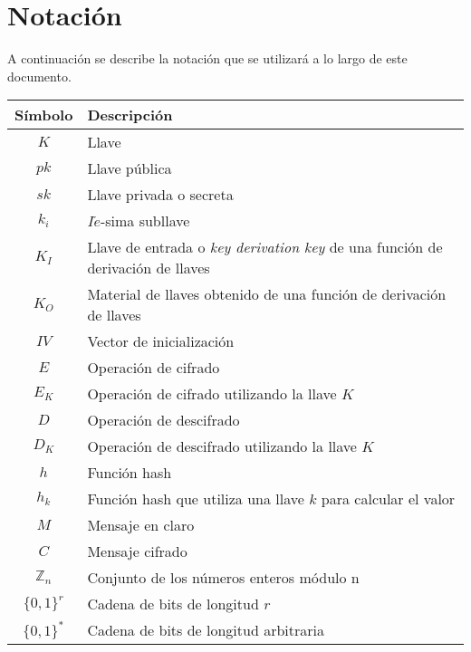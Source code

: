 %
%

\section*{Notación}

A continuación se describe la notación que se utilizará a lo largo de
este documento.

\begin{table}[H]
  \begin{center}
    \begin{tabular}{c|l}
      \hline
      Símbolo & Descripción \\
      \hline
      $K$ & Llave \\
      \hline
      $pk$ & Llave pública \\
      \hline
      $sk$ & Llave privada o secreta \\
      \hline
      $k_i$ & $I\acute{e}$-sima subllave \\
      \hline
      $K_I$ & Llave de entrada o \textit{key derivation key} de una función
      de derivación de llaves \\
      \hline
      $K_O$ & Material de llaves obtenido de una función de derivación de llaves \\
      \hline
      $IV$ & Vector de inicialización \\
      \hline
      $E$ & Operación de cifrado \\
      \hline
      $E_K$ & Operación de cifrado utilizando la llave $K$ \\
      \hline
      $D$ & Operación de descifrado \\
      \hline
      $D_K$ & Operación de descifrado utilizando la llave $K$ \\
      \hline
      $h$ & Función hash \\
      \hline
      $h_k$ & Función hash que utiliza una llave $k$ para calcular el valor\\
      \hline
      $M$ & Mensaje en claro\\
      \hline
      $C$ & Mensaje cifrado\\
      \hline
      $\mathbb{Z}_n$ & Conjunto de los números enteros módulo n\\
      \hline
      $\{0,1\}^r$ & Cadena de bits de longitud $r$ \\
      \hline
      $\{0,1\}^*$ & Cadena de bits de longitud arbitraria \\

\end{tabular}
\end{center}
\end{table}
